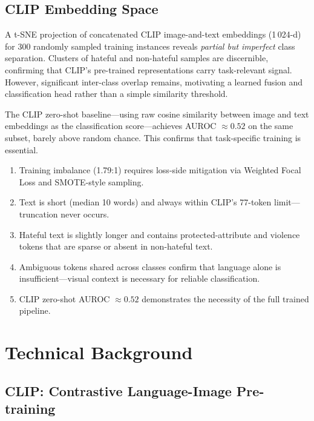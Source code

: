 \documentclass[12pt,a4paper]{article}
\begin{document}
\subsection{CLIP Embedding Space}

A t-SNE projection of concatenated CLIP image-and-text embeddings (1\,024-d) for 300 randomly sampled training instances reveals \textit{partial but imperfect} class separation. Clusters of hateful and non-hateful samples are discernible, confirming that CLIP's pre-trained representations carry task-relevant signal. However, significant inter-class overlap remains, motivating a learned fusion and classification head rather than a simple similarity threshold.

The CLIP zero-shot baseline---using raw cosine similarity between image and text embeddings as the classification score---achieves AUROC $\approx 0.52$ on the same subset, barely above random chance. This confirms that task-specific training is essential.

\begin{tcolorbox}[highlight, title={EDA Key Takeaways}]
\begin{enumerate}[leftmargin=1.2cm]
  \item Training imbalance (1.79:1) requires loss-side mitigation via Weighted Focal Loss and SMOTE-style sampling.
  \item Text is short (median 10 words) and always within CLIP's 77-token limit---truncation never occurs.
  \item Hateful text is slightly longer and contains protected-attribute and violence tokens that are sparse or absent in non-hateful text.
  \item Ambiguous tokens shared across classes confirm that language alone is insufficient---visual context is necessary for reliable classification.
  \item CLIP zero-shot AUROC $\approx 0.52$ demonstrates the necessity of the full trained pipeline.
\end{enumerate}
\end{tcolorbox}

\section{Technical Background}

\subsection{CLIP: Contrastive Language-Image Pre-training}
\end{document}
